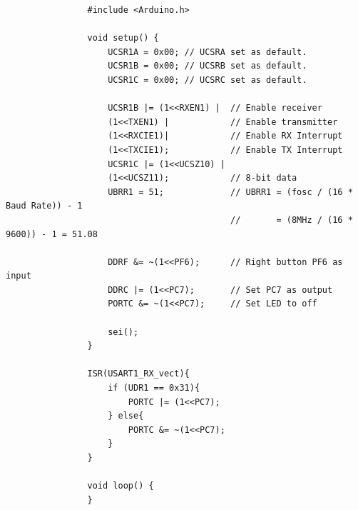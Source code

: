 \documentclass{report}
\begin{document}
\begin{verbatim}
                #include <Arduino.h>

                void setup() {
                    UCSR1A = 0x00; // UCSRA set as default. 
                    UCSR1B = 0x00; // UCSRB set as default.
                    UCSR1C = 0x00; // UCSRC set as default.

                    UCSR1B |= (1<<RXEN1) |  // Enable receiver
                    (1<<TXEN1) |            // Enable transmitter
                    (1<<RXCIE1)|            // Enable RX Interrupt
                    (1<<TXCIE1);            // Enable TX Interrupt
                    UCSR1C |= (1<<UCSZ10) |
                    (1<<UCSZ11);            // 8-bit data
                    UBRR1 = 51;             // UBRR1 = (fosc / (16 * Baud Rate)) - 1
                                            //       = (8MHz / (16 * 9600)) - 1 = 51.08

                    DDRF &= ~(1<<PF6);      // Right button PF6 as input
                    DDRC |= (1<<PC7);       // Set PC7 as output
                    PORTC &= ~(1<<PC7);     // Set LED to off

                    sei();
                }

                ISR(USART1_RX_vect){
                    if (UDR1 == 0x31){
                        PORTC |= (1<<PC7);
                    } else{
                        PORTC &= ~(1<<PC7);
                    }
                }

                void loop() {
                }
\end{verbatim}
\end{document}
